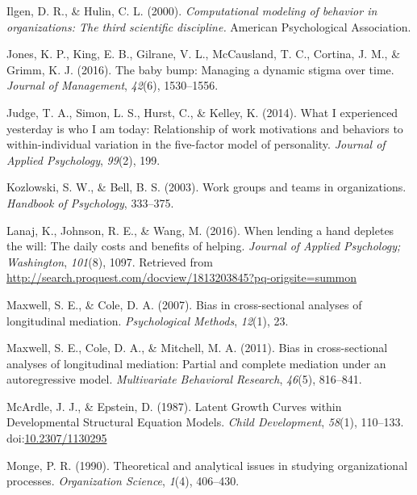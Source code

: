 \documentclass[english,,man]{apa6}
\theoremstyle{definition}
\theoremstyle{definition}
\theoremstyle{definition}
\theoremstyle{remark}
\begin{document}
\leavevmode\hypertarget{ref-ilgen_computational_2000}{}%
Ilgen, D. R., \& Hulin, C. L. (2000). \emph{Computational modeling of
behavior in organizations: The third scientific discipline.} American
Psychological Association.

\leavevmode\hypertarget{ref-jones_baby_2016}{}%
Jones, K. P., King, E. B., Gilrane, V. L., McCausland, T. C., Cortina,
J. M., \& Grimm, K. J. (2016). The baby bump: Managing a dynamic stigma
over time. \emph{Journal of Management}, \emph{42}(6), 1530--1556.

\leavevmode\hypertarget{ref-judge_what_2014}{}%
Judge, T. A., Simon, L. S., Hurst, C., \& Kelley, K. (2014). What I
experienced yesterday is who I am today: Relationship of work
motivations and behaviors to within-individual variation in the
five-factor model of personality. \emph{Journal of Applied Psychology},
\emph{99}(2), 199.

\leavevmode\hypertarget{ref-kozlowski_work_2003}{}%
Kozlowski, S. W., \& Bell, B. S. (2003). Work groups and teams in
organizations. \emph{Handbook of Psychology}, 333--375.

\leavevmode\hypertarget{ref-lanaj_when_2016}{}%
Lanaj, K., Johnson, R. E., \& Wang, M. (2016). When lending a hand
depletes the will: The daily costs and benefits of helping.
\emph{Journal of Applied Psychology; Washington}, \emph{101}(8), 1097.
Retrieved from
\url{http://search.proquest.com/docview/1813203845?pq-origsite=summon}

\leavevmode\hypertarget{ref-maxwell2007bias}{}%
Maxwell, S. E., \& Cole, D. A. (2007). Bias in cross-sectional analyses
of longitudinal mediation. \emph{Psychological Methods}, \emph{12}(1),
23.

\leavevmode\hypertarget{ref-maxwell2011bias}{}%
Maxwell, S. E., Cole, D. A., \& Mitchell, M. A. (2011). Bias in
cross-sectional analyses of longitudinal mediation: Partial and complete
mediation under an autoregressive model. \emph{Multivariate Behavioral
Research}, \emph{46}(5), 816--841.

\leavevmode\hypertarget{ref-mcardle_latent_1987}{}%
McArdle, J. J., \& Epstein, D. (1987). Latent Growth Curves within
Developmental Structural Equation Models. \emph{Child Development},
\emph{58}(1), 110--133.
doi:\href{https://doi.org/10.2307/1130295}{10.2307/1130295}

\leavevmode\hypertarget{ref-monge_theoretical_1990}{}%
Monge, P. R. (1990). Theoretical and analytical issues in studying
organizational processes. \emph{Organization Science}, \emph{1}(4),
406--430.
\end{document}
